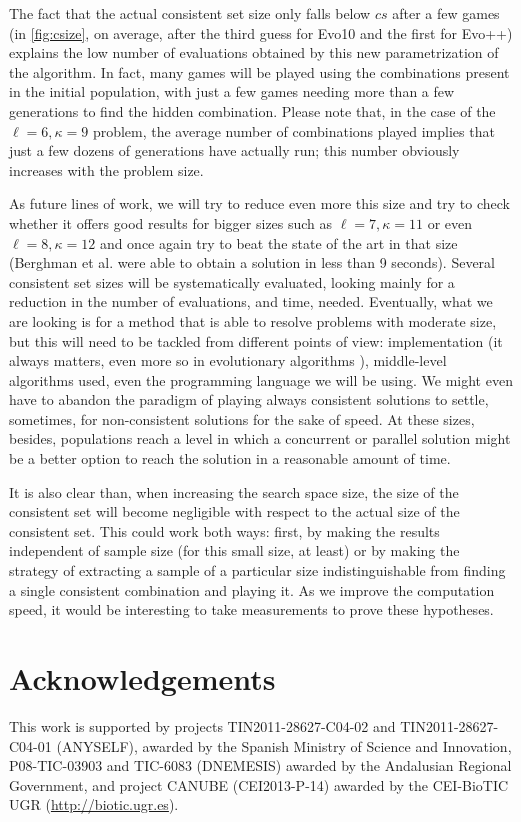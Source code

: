 \documentclass[conference]{IEEEtran}
\begin{document}
The fact that the actual consistent set size only falls below $cs$
after a few games (in \ref{fig:csize}, on average, after the third
guess for Evo10 and the first for Evo++)  explains the low number of
evaluations obtained by this new parametrization of the 
algorithm. In fact, many games will be played using the combinations
present in the initial population, with just a few games needing
more than a few generations to find the hidden combination. Please note that,
in the case of the $\ell=6,\kappa=9$ problem, the average number of combinations
played implies that just a few dozens of generations have actually
run; this number obviously increases with the problem size.

As future lines of work, we will try to reduce even more this size and
try to check whether it offers good results for bigger sizes such as
$\ell=7,\kappa=11$ or even $\ell=8,\kappa=12$ and once again try to
beat the state of the art in that size (Berghman et al. were able to
obtain a solution in less than 9 seconds).  Several consistent set
sizes will be systematically evaluated, looking mainly for a reduction
in the number of evaluations, and time, needed. Eventually, what we
are looking is for a method that is able to resolve problems with
moderate size, but this will need to be tackled from different points
of view: implementation (it always matters, even more so in evolutionary
algorithms \cite{DBLP:conf/iwann/MereloRACML11}), middle-level algorithms
used, even the programming language we will be using. We might even
have to abandon the paradigm of playing always consistent solutions to
settle, sometimes, for non-consistent solutions for the sake of
speed. At these sizes, besides, populations reach a level in which a
concurrent or parallel solution might be a better option to reach the
solution in a reasonable amount of time. 

It is also clear than, when increasing the search space size, the size
of the consistent set will become negligible with respect to the
actual size of the consistent set. This could work both ways: first,
by making the results independent of sample size (for this small size,
at least) or by making the strategy of extracting a sample of a
particular size indistinguishable from finding a single consistent
combination and playing it. As we improve the computation speed, it
would be interesting to take measurements to prove these hypotheses. 

\section*{Acknowledgements}
This work is supported by projects 
TIN2011-28627-C04-02 and TIN2011-28627-C04-01 (ANYSELF), awarded by the Spanish
Ministry of Science and Innovation, P08-TIC-03903 and TIC-6083
(DNEMESIS) awarded by the Andalusian Regional Government, and project CANUBE (CEI2013-P-14)
awarded by the CEI-BioTIC UGR
(\url{http://biotic.ugr.es}). 
\end{document}
